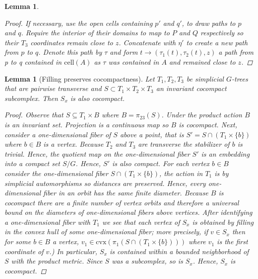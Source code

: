 \documentclass[12pt,parskip=full]{report}
\theoremstyle{plain}
\newtheorem{lem}[thm]{Lemma}
\theoremstyle{definition}
\begin{document}
\begin{lem}
\begin{proof}
If necessary, use the open cells containing \(p'\) and \(q'\), to draw paths  to \(p\) and \(q\). Require the interior of their domains to map to \(P\) and \(Q\) respectively so their \(T_3\) coordinates remain close to \(z\). Concatenate with \(\eta'\) to create a new path from \(p\) to \(q\). Denote this path by \(\tau\) and form \(t\to (\tau_1(t), \tau_2(t), z)\) a path from p to q contained in \(\text{cell}(A)\) as \(\tau\) was contained in \(A\) and remained close to \(z\).
    
    \end{proof}
    
    
\end{lem}

\begin{lem} 
[Filling preserves cocompactness]
\label{lem:fillingcocompact}
    Let $T_1,T_2,T_3$ be simplicial $G$-trees that are pairwise transverse and $S\subset T_1\times T_2\times T_3$ an invariant cocompact subcomplex. Then $S_x$ is also cocompact.
\begin{proof}
    Observe that $S\subseteq T_1\times B$ where $B=\pi_{23}(S)$. Under the product action $B$ is an invariant set. Projection is a continuous map so $B$ is cocompact. Next, consider a one-dimensional fiber of $S$ above a point, that is $S' = S\cap (T_1\times \{b\})$ where $b\in B$ is a vertex. Because $T_2$ and $T_3$ are transverse the stabilizer of $b$ is trivial. Hence, the quotient map on the one-dimensional fiber $S'$ is an embedding into a compact set $S/G$. Hence, $S'$ is also compact. For each vertex $b\in B$ consider the one-dimensional fiber $S\cap (T_1\times \{b\})$, the action in $T_1$ is by simplicial automorphisms so distances are preserved. Hence, every one-dimensional fiber in an orbit has the same finite diameter. Because $B$ is cocompact there are a finite number of vertex orbits and therefore a universal bound on the diameters of one-dimensional fibers above vertices. After identifying a one-dimensional fiber with $T_1$ we see that each vertex of $S_x$ is obtained by filling in the convex hull of some one-dimensional fiber; more precisely, if $v\in S_x$ then for some $b\in B$ a vertex, $v_1\in \text{cvx}(\pi_1(S\cap(T_1\times \{b\})))$ where $v_1$ is the first coordinate of $v$.) In particular, $S_x$ is contained within a bounded neighborhood of $S$ with the product metric. Since $S$ was a subcomplex, so is $S_x$. Hence, $S_x$ is cocompact.
\end{proof}
\end{lem}
\end{document}
